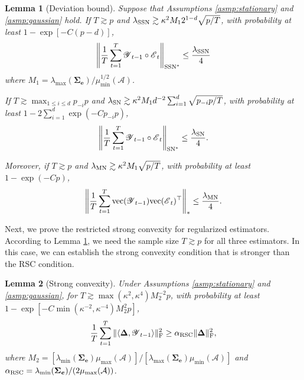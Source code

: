\documentclass[12pt]{article}
\newtheorem{lemma}{Lemma}
\newcommand{\bm}{\boldsymbol}
\newcommand{\cm}[1]{\mbox{\boldmath$\mathscr{#1}$}}
\begin{document}

\begin{lemma}[Deviation bound]
	\label{lemma:dualnorm}
	Suppose that Assumptions \ref{asmp:stationary} and \ref{asmp:gaussian} hold. If $T\gtrsim p$ and $\lambda_{\textup{SSN}}\gtrsim \kappa^2M_12^{1-d}\sqrt{p/T}$, with probability at least $1-\exp[-C(p-d)]$,
	\begin{equation}
	\left\|\frac{1}{T}\sum_{t=1}^T\cm{Y}_{t-1}\circ\cm{E}_t\right\|_{\textup{SSN}^*}\leq\frac{\lambda_{\textup{SSN}}}{4}
	\end{equation}
	where $M_1=\lambda_{\max}(\bm{\Sigma_e})/\mu^{1/2}_{\min}(\mathcal{A})$.
	
	If  $T\gtrsim \max_{1\leq i\leq d}p_{-i}p$ and $\lambda_{\textup{SN}}\gtrsim \kappa^2M_1d^{-2}\sum_{i=1}^d\sqrt{p_{-i}p/T}$, with probability at least $1-2\sum_{i=1}^d\exp(-Cp_{-i}p)$,
	\begin{equation}
	\left\|\frac{1}{T}\sum_{t=1}^T\cm{Y}_{t-1}\circ\cm{E}_t\right\|_{\textup{SN}^*}\leq\frac{\lambda_{\textup{SN}}}{4}.
	\end{equation} 
	
	Moreover, if $T\gtrsim p$ and $\lambda_{\textup{MN}}\gtrsim \kappa^2M_1\sqrt{p/T}$, with probability at least $1-\exp(-Cp)$,
	\begin{equation}
	\left\|\frac{1}{T}\sum_{t=1}^T\textup{vec}(\cm{Y}_{t-1})\textup{vec}(\cm{E}_t)^\top\right\|_{*}\leq\frac{\lambda_{\textup{MN}}}{4}.
	\end{equation} 
\end{lemma}

Next, we prove the restricted strong convexity for regularized estimators. According to Lemma \ref{lemma:dualnorm}, we need the sample size  $T\gtrsim p$ for all three estimators. In this case, we can establish the strong convexity condition that is stronger than the RSC condition.

\begin{lemma}[Strong convexity]
	\label{lemma:RSC}
	Under Assumptions \ref{asmp:stationary} and \ref{asmp:gaussian}, for $T\gtrsim\max(\kappa^2,\kappa^4)M_2^{-2}p$, with probability at least $1-\exp[-C\min(\kappa^{-2},\kappa^{-4})M_2^2p]$,
	\begin{equation}
	\frac{1}{T}\sum_{t=1}^T	\|\langle\bm{\Delta},\cm{Y}_{t-1}\rangle\|_\text{F}^2\geq\alpha_{\textup{RSC}}\|\bm{\Delta}\|_{\textup{F}}^2,
	\end{equation}
	where $M_2=[\lambda_{\min}(\bm{\Sigma}_{\bm{e}})\mu_{\max}(\mathcal{A})]/[\lambda_{\max}(\bm{\Sigma}_{\bm{e}})\mu_{\min}(\mathcal{A})]$ and $\alpha_{\textup{RSC}}=\lambda_{\min}(\bm{\Sigma}_{\bm{e}})/(2\mu_{\max}(\mathcal{A}))$.
	
\end{lemma}
\end{document}
